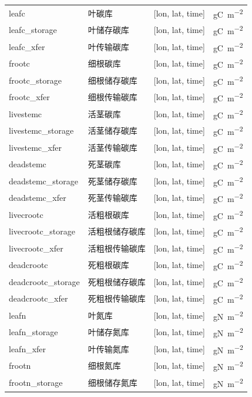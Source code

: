 \documentclass[a4paper,12pt,twoside]{article}
\begin{document}
{\begin{longtable}[htbp]{lp{}ll}
\bottomrule
\endfoot
\bottomrule
\endlastfoot
leafc & 叶碳库 & {[}lon, lat, time{]} & \unit{gC.m^{-2}} \\
leafc\_storage & 叶储存碳库 & {[}lon, lat, time{]}  & \unit{gC.m^{-2}} \\
leafc\_xfer & 叶传输碳库 & {[}lon, lat, time{]}  & \unit{gC.m^{-2}} \\
frootc & 细根碳库 & {[}lon, lat, time{]}  & \unit{gC.m^{-2}} \\
frootc\_storage& 细根储存碳库 & {[}lon, lat, time{]} & \unit{gC.m^{-2}} \\
frootc\_xfer & 细根传输碳库 & {[}lon, lat, time{]} & \unit{gC.m^{-2}} \\
livestemc & 活茎碳库 & {[}lon, lat, time{]}  & \unit{gC.m^{-2}} \\
livestemc\_storage & 活茎储存碳库 & {[}lon, lat, time{]} & \unit{gC.m^{-2}} \\
livestemc\_xfer & 活茎传输碳库 & {[}lon, lat, time{]} & \unit{gC.m^{-2}} \\
deadstemc & 死茎碳库 & {[}lon, lat, time{]}  & \unit{gC.m^{-2}} \\
deadstemc\_storage  & 死茎储存碳库 & {[}lon, lat, time{]} & \unit{gC.m^{-2}} \\
deadstemc\_xfer & 死茎传输碳库 & {[}lon, lat, time{]} & \unit{gC.m^{-2}} \\
livecrootc & 活粗根碳库 & {[}lon, lat, time{]}  & \unit{gC.m^{-2}} \\
livecrootc\_storage & 活粗根储存碳库 & {[}lon, lat, time{]} & \unit{gC.m^{-2}} \\
livecrootc\_xfer   & 活粗根传输碳库 & {[}lon, lat, time{]} & \unit{gC.m^{-2}} \\
deadcrootc     & 死粗根碳库 & {[}lon, lat, time{]}  & \unit{gC.m^{-2}} \\
deadcrootc\_storage & 死粗根储存碳库 & {[}lon, lat, time{]}  & \unit{gC.m^{-2}} \\
deadcrootc\_xfer   & 死粗根传输碳库 & {[}lon, lat, time{]} & \unit{gC.m^{-2}} \\
leafn        & 叶氮库 & {[}lon, lat, time{]}  & \unit{gN.m^{-2}} \\
leafn\_storage    & 叶储存氮库 & {[}lon, lat, time{]}  & \unit{gN.m^{-2}} \\
leafn\_xfer     & 叶传输氮库 & {[}lon, lat, time{]}  & \unit{gN.m^{-2}} \\
frootn       & 细根氮库 & {[}lon, lat, time{]}  & \unit{gN.m^{-2}} \\
frootn\_storage   & 细根储存氮库 & {[}lon, lat, time{]} & \unit{gN.m^{-2}} \\

\end{longtable}}
\end{document}
